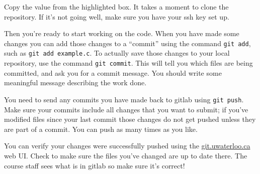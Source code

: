 \documentclass[letterpaper,10pt]{article}
\begin{document}
Copy the value from the highlighted box. It takes a moment to clone the repository. If it's not going well, make sure you have your ssh key set up. 

Then you're ready to start working on the code. When you have made some changes you can add those changes to a ``commit'' using the command \texttt{git add}, such as \texttt{git add example.c}. To actually save those changes to your local repository, use the command \texttt{git commit}. This will tell you which files are being committed, and ask you for a commit message. You should write some meaningful message describing the work done.

You need to send any commits you have made back to gitlab using \texttt{git push}. Make sure your commits include all changes that you want to submit; if you've modified files since your last commit those changes do not get pushed unless they are part of a commit. You can push as many times as you like.

You can verify your changes were successfully pushed using the \url{git.uwaterloo.ca} web UI. Check to make sure the files you've changed are up to date there. The course staff sees what is in gitlab so make sure it's correct!
\end{document}
